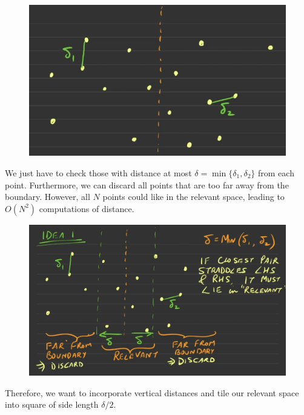 \documentclass{article}
\begin{document}
    \begin{figure}[H]
      \centering 
      \includegraphics[scale=0.4]{img/closest_point.png}
      \caption{} 
      \label{fig:closest_point}
    \end{figure}

    We just have to check those with distance at most $\delta = \min\{\delta_1, \delta_2\}$ from each point. Furthermore, we can discard all points that are too far away from the boundary. However, all $N$ points could like in the relevant space, leading to $O(N^2)$ computations of distance. 

    \begin{figure}[H]
      \centering 
      \includegraphics[scale=0.4]{img/cp2.png}
      \caption{} 
      \label{fig:closest_point2}
    \end{figure}

    Therefore, we want to incorporate vertical distances and tile our relevant space into square of side length $\delta/2$.  
\end{document}
